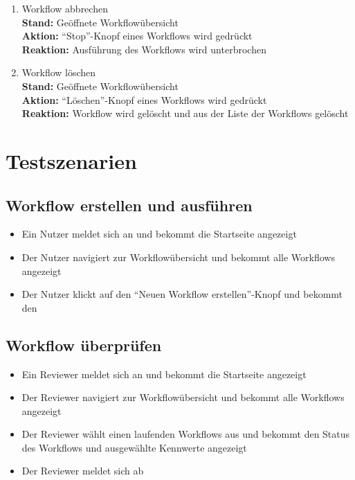 \begin{enumerate}
    \item Workflow abbrechen
    \\ \textbf{Stand:} Geöffnete Workflowübersicht
    \\ \textbf{Aktion:} \enquote{Stop}-Knopf eines Workflows wird gedrückt
    \\ \textbf{Reaktion:} Ausführung des Workflows wird unterbrochen
    \item Workflow löschen
    \\ \textbf{Stand:} Geöffnete Workflowübersicht
    \\ \textbf{Aktion:} \enquote{Löschen}-Knopf eines Workflows wird gedrückt
    \\ \textbf{Reaktion:} Workflow wird gelöscht und aus der Liste der Workflows gelöscht
\end{enumerate}


\section{Testszenarien}

\subsection*{Workflow erstellen und ausführen}
\begin{itemize}
    \item Ein \Gls{Nutzer} meldet sich an und bekommt die Startseite angezeigt
    \item Der \Gls{Nutzer} navigiert zur Workflowübersicht und bekommt alle Workflows angezeigt
    \item Der \gls{Nutzer} klickt auf den \enquote{Neuen Workflow erstellen}-Knopf und bekommt den 
\end{itemize}

%
\subsection*{Workflow überprüfen}
\begin{itemize}
    \item Ein \Gls{Reviewer} meldet sich an und bekommt die Startseite angezeigt
    \item Der \Gls{Reviewer} navigiert zur Workflowübersicht und bekommt alle Workflows angezeigt
    \item Der \Gls{Reviewer} wählt einen laufenden Workflows aus und bekommt den Status des Workflows und ausgewählte Kennwerte angezeigt
    \item Der \gls{Reviewer} meldet sich ab
\end{itemize}

